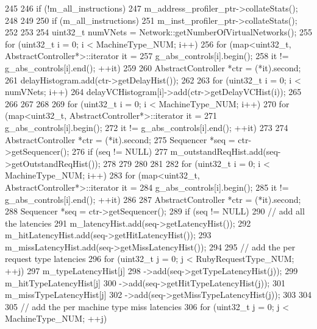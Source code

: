 \begin{DoxyCode}
245 {
246     if (!m_all_instructions) {
247         m_address_profiler_ptr->collateStats();
248     }
249 
250     if (m_all_instructions) {
251         m_inst_profiler_ptr->collateStats();
252     }
253 
254     uint32_t numVNets = Network::getNumberOfVirtualNetworks();
255     for (uint32_t i = 0; i < MachineType_NUM; i++) {
256         for (map<uint32_t, AbstractController*>::iterator it =
257                   g_abs_controls[i].begin();
258              it != g_abs_controls[i].end(); ++it) {
259 
260             AbstractController *ctr = (*it).second;
261             delayHistogram.add(ctr->getDelayHist());
262 
263             for (uint32_t i = 0; i < numVNets; i++) {
264                 delayVCHistogram[i]->add(ctr->getDelayVCHist(i));
265             }
266         }
267     }
268 
269     for (uint32_t i = 0; i < MachineType_NUM; i++) {
270         for (map<uint32_t, AbstractController*>::iterator it =
271                 g_abs_controls[i].begin();
272                 it != g_abs_controls[i].end(); ++it) {
273 
274             AbstractController *ctr = (*it).second;
275             Sequencer *seq = ctr->getSequencer();
276             if (seq != NULL) {
277                 m_outstandReqHist.add(seq->getOutstandReqHist());
278             }
279         }
280     }
281 
282     for (uint32_t i = 0; i < MachineType_NUM; i++) {
283         for (map<uint32_t, AbstractController*>::iterator it =
284                 g_abs_controls[i].begin();
285                 it != g_abs_controls[i].end(); ++it) {
286 
287             AbstractController *ctr = (*it).second;
288             Sequencer *seq = ctr->getSequencer();
289             if (seq != NULL) {
290                 // add all the latencies
291                 m_latencyHist.add(seq->getLatencyHist());
292                 m_hitLatencyHist.add(seq->getHitLatencyHist());
293                 m_missLatencyHist.add(seq->getMissLatencyHist());
294 
295                 // add the per request type latencies
296                 for (uint32_t j = 0; j < RubyRequestType_NUM; ++j) {
297                     m_typeLatencyHist[j]
298                         ->add(seq->getTypeLatencyHist(j));
299                     m_hitTypeLatencyHist[j]
300                         ->add(seq->getHitTypeLatencyHist(j));
301                     m_missTypeLatencyHist[j]
302                         ->add(seq->getMissTypeLatencyHist(j));
303                 }
304 
305                 // add the per machine type miss latencies
306                 for (uint32_t j = 0; j < MachineType_NUM; ++j) {
}}}}}
\end{DoxyCode}

